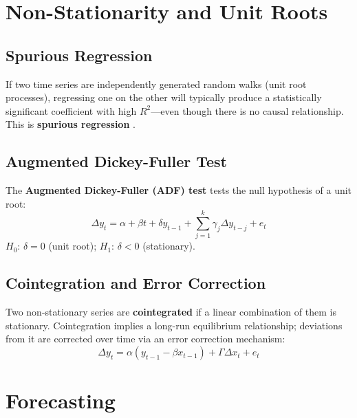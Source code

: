 

\section{Non-Stationarity and Unit Roots}
\label{sec_UnitRoot}

\subsection{Spurious Regression}

If two time series are independently generated random walks (unit root
processes), regressing one on the other will typically produce a
statistically significant coefficient with high $R^2$---even though there
is no causal relationship. This is \textbf{spurious
regression} \citep{Granger1974}.

\subsection{Augmented Dickey-Fuller Test}

The \textbf{Augmented Dickey-Fuller (ADF) test}
tests the null hypothesis of a unit root:
\begin{equation}
  \Delta y_t = \alpha + \beta t + \delta y_{t-1}
               + \sum_{j=1}^{k}\gamma_j \Delta y_{t-j} + e_t
\end{equation}
$H_0$: $\delta = 0$ (unit root); $H_1$: $\delta < 0$ (stationary).

\subsection{Cointegration and Error Correction}

Two non-stationary series are \textbf{cointegrated} if
a linear combination of them is stationary. Cointegration implies a
long-run equilibrium relationship; deviations from it are corrected over time
via an error correction mechanism:
\begin{equation}
  \Delta y_t = \alpha(y_{t-1} - \beta x_{t-1}) + \Gamma\Delta x_t + e_t
\end{equation}



\section{Forecasting}
\label{sec_Forecasting}

